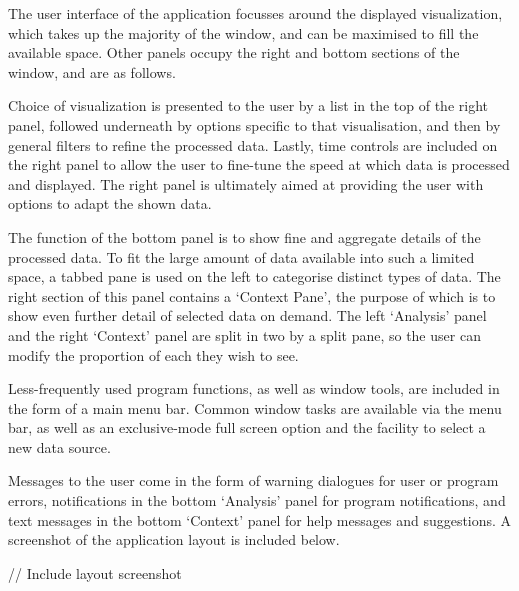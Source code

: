 The user interface of the application focusses around the displayed
visualization, which takes up the majority of the window, and can be maximised
to fill the available space. Other panels occupy the right and bottom sections
of the window, and are as follows.

Choice of visualization is presented to the user by a list in the top of the
right panel, followed underneath by options specific to that visualisation, and
then by general filters to refine the processed data. Lastly, time controls are
included on the right panel to allow the user to fine-tune the speed at which
data is processed and displayed. The right panel is ultimately aimed at
providing the user with options to adapt the shown data.

The function of the bottom panel is to show fine and aggregate details of the
processed data. To fit the large amount of data available into such a limited
space, a tabbed pane is used on the left to categorise distinct types of data.
The right section of this panel contains a `Context Pane', the purpose of
which is to show even further detail of selected data on demand. The left
`Analysis' panel and the right `Context' panel are split in two by a split
pane, so the user can modify the proportion of each they wish to see.

Less-frequently used program functions, as well as window tools, are included
in the form of a main menu bar. Common window tasks are available via the menu
bar, as well as an exclusive-mode full screen option and the facility to select
a new data source.

Messages to the user come in the form of warning dialogues for user or program
errors, notifications in the bottom `Analysis' panel for program notifications,
and text messages in the bottom `Context' panel for help messages and
suggestions. A screenshot of the application layout is included below.

// Include layout screenshot

